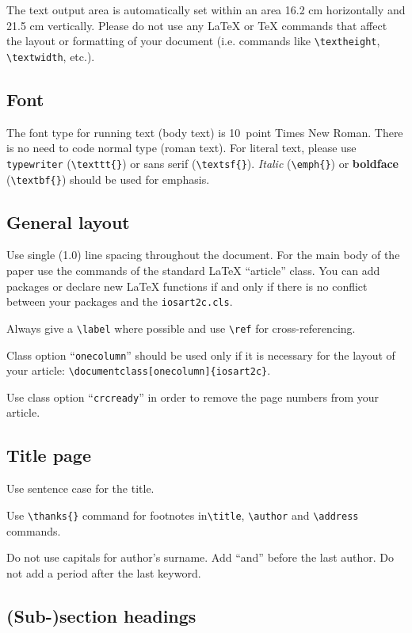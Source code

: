 \documentclass{iosart2c}
\begin{document}
The text output area is automatically set within an area 16.2 cm
horizontally and 21.5 cm vertically. Please do not use any
\LaTeX{} or \TeX{} commands that affect the layout or formatting of
your document (i.e. commands like \verb|\textheight|,
\verb|\textwidth|, etc.).

\subsection{Font}

The font type for running text (body text) is 10~point Times New Roman.
There is no need to code normal type (roman text). For literal text, please use
\texttt{type\-writer} (\verb|\texttt{}|)
or \textsf{sans serif} (\verb|\textsf{}|). \emph{Italic} (\verb|\emph{}|)
or \textbf{boldface} (\verb|\textbf{}|) should be used for emphasis.


\subsection{General layout}

Use single (1.0) line spacing throughout the document. For the main
body of the paper use the commands of the standard \LaTeX{}
``article'' class. You can add packages or declare new \LaTeX{}
functions if and only if there is no conflict between your packages
and the \texttt{iosart2c.cls}.

Always give a \verb|\label| where possible and use \verb|\ref| for cross-referencing.

Class option ``\texttt{onecolumn}'' should be used only if it is
necessary for the layout of your article:\hfill\break
\verb|\documentclass[onecolumn]{iosart2c}|.

Use class option ``\texttt{crcready}'' in order to remove the page numbers from your article.


\subsection{Title page}

Use sentence case for the title.

Use \verb|\thanks{}| command for footnotes in\break \verb|\title|,
\verb|\author| and \verb|\address| commands.

Do not use capitals for author's surname. Add ``and'' before the last
author. Do not add a period after the last keyword.


\subsection{(Sub-)section headings}
\end{document}
